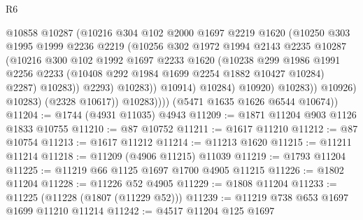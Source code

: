 \begin{lexlean}{R6}
\begin{coremodule}
                                @10858
                                @10287
                                (@10216
                                  @304
                                  @102
                                  @2000
                                  @1697
                                  @2219
                                  @1620
                                  (@10250
                                    @303
                                    @1995
                                    @1999
                                    @2236
                                    @2219
                                    (@10256
                                      @302
                                      @1972
                                      @1994
                                      @2143
                                      @2235
                                      @10287
                                      (@10216
                                        @300
                                        @102
                                        @1992
                                        @1697
                                        @2233
                                        @1620
                                        (@10238
                                          @299
                                          @1986
                                          @1991
                                          @2256
                                          @2233
                                          (@10408 @292 @1984 @1699 @2254 @1882 @10427 @10284)
                                          @2287)
                                        @10283))
                                    @2293)
                                  @10283))
                              @10914)
                            @10284)
                          @10920)
                        @10283))
                    @10926)
                  @10283)
                (@2328 @10617))
              @10283))))
      (@5471 @1635 @1626 @6544 @10674))
@11204 := @1744 (@4931 @11035) @4943
@11209 := @1871 @11204 @903 @1126 @1833 @10755
@11210 := @87 @10752
@11211 := @1617 @11210
@11212 := @87 @10754
@11213 := @1617 @11212
@11214 := @11213 @1620
@11215 := @11211 @11214
@11218 := @11209 (@4906 @11215) @11039
@11219 := @1793 @11204
@11225 := @11219 @66 @1125 @1697 @1700 @4905 @11215
@11226 := @1802 @11204
@11228 := @11226 @52 @4905
@11229 := @1808 @11204
@11233 := @11225 (@11228 (@1807 (@11229 @52)))
@11239 := @11219 @738 @653 @1697 @1699 @11210 @11214
@11242 := @4517 @11204 @125 @1697

\end{coremodule}
\end{lexlean}
